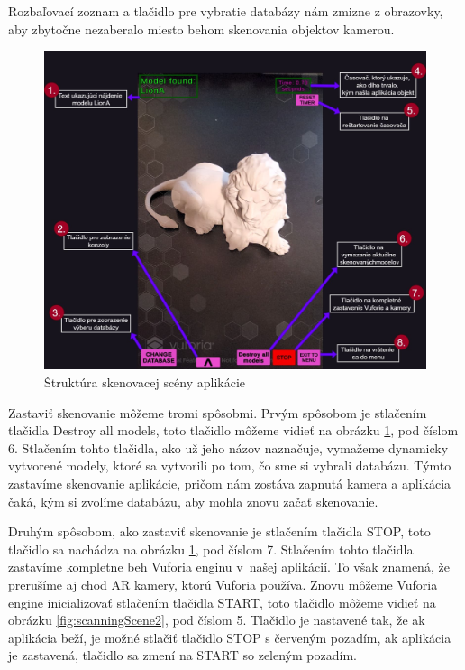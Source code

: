 Rozbaľovací zoznam a tlačidlo pre vybratie databázy nám zmizne z obrazovky, aby zbytočne nezaberalo miesto behom skenovania objektov kamerou. 

\begin{figure}[!h]
  \centering
  \includegraphics[width=1\textwidth]{img/Scanning_scene_part1.jpg}
  \caption{Štruktúra skenovacej scény aplikácie}
  \label{fig:scanningScene1}
\end{figure}

Zastaviť skenovanie môžeme tromi spôsobmi. Prvým spôsobom je stlačením tlačidla Destroy all models, toto tlačidlo môžeme vidieť na obrázku \ref{fig:scanningScene1}, pod číslom 6. Stlačením tohto tlačidla, ako už jeho názov naznačuje, vymažeme dynamicky vytvorené modely, ktoré sa vytvorili po tom, čo sme si vybrali databázu. Týmto zastavíme skenovanie aplikácie, pričom nám zostáva zapnutá kamera a aplikácia čaká, kým si zvolíme databázu, aby mohla znovu začať skenovanie.

Druhým spôsobom, ako zastaviť skenovanie je stlačením tlačidla STOP,  toto tlačidlo sa nachádza na obrázku \ref{fig:scanningScene1}, pod číslom 7. Stlačením tohto tlačidla zastavíme kompletne beh Vuforia enginu v~našej aplikácií. To však znamená, že prerušíme aj chod AR kamery, ktorú Vuforia používa. Znovu môžeme Vuforia engine inicializovať stlačením tlačidla START, toto tlačidlo môžeme vidieť na obrázku \ref{fig:scanningScene2}, pod číslom 5. Tlačidlo je nastavené tak, že ak aplikácia beží, je možné stlačiť tlačidlo STOP s červeným pozadím, ak aplikácia je zastavená, tlačidlo sa zmení na START so zeleným pozadím.

